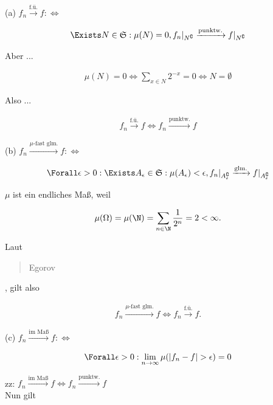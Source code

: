 \begin{solution}

(a) $f_n \xrightarrow{\text{f.ü.}} f : \Leftrightarrow$

\begin{align*}
  \Exists N \in \mathfrak{S}:
  \mu(N) = 0,
  f_n|_{N^\complement} \xrightarrow{\text{punktw.}} f|_{N^\complement}
\end{align*}

Aber ...

\begin{align*}
  \mu(N) = 0
  \Leftrightarrow
  \sum_{x \in N} 2^{-x} = 0
  \Leftrightarrow
  N = \emptyset
\end{align*}

Also ...

\begin{align*}
  f_n \xrightarrow{\text{f.ü.}} f
  \Leftrightarrow
  f_n \xrightarrow{\text{punktw.}} f
\end{align*}

(b) $f_n \xrightarrow{\mu \text{-fast glm.}} f : \Leftrightarrow$

\begin{align*}
  \Forall \epsilon > 0:
  \Exists A_\epsilon \in \mathfrak{S}:
  \mu(A_\epsilon) < \epsilon,
  f_n|_{A_\epsilon^\complement} \xrightarrow{\text{glm.}} f|_{A_\epsilon^\complement}
\end{align*}

$\mu$ ist ein endliches Maß, weil

\begin{align*}
  \mu(\Omega) = \mu(\N) = \sum_{n \in \N} \frac{1}{2^n} = 2 < \infty.
\end{align*}

Laut \blockquote{Egorov}, gilt also

\begin{align*}
  f_n \xrightarrow{\mu \text{-fast glm.}} f
  \Leftrightarrow
  f_n \xrightarrow{\text{f.ü.}} f.
\end{align*}

(c) $f_n \xrightarrow{\text{im Maß}} f : \Leftrightarrow$

\begin{align*}
  \Forall \epsilon > 0:
  \lim_{n \to \infty} \mu(|f_n - f| > \epsilon) = 0
\end{align*}

zz: $f_n \xrightarrow{\text{im Maß}} f \Leftrightarrow f_n \xrightarrow{\text{punktw.}} f$ \\

Nun gilt


\end{solution}
